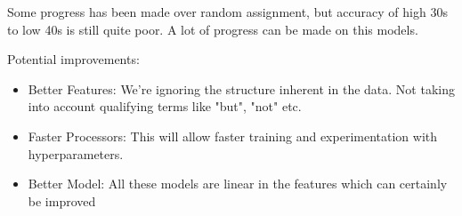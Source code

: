 \documentclass[11pt]{article}
\begin{document}
Some progress has been made over random assignment, but accuracy of high 30s to
low 40s is still quite poor. A lot of progress can be made on this models.

Potential improvements:

\begin{itemize}
  \item Better Features:
  We're ignoring the structure inherent in the data. Not taking into account
  qualifying terms like "but", "not" etc.

  \item Faster Processors:
  This will allow faster training and experimentation with hyperparameters.

  \item Better Model:
  All these models are linear in the features which can certainly be improved
\end{itemize}



\end{document}
